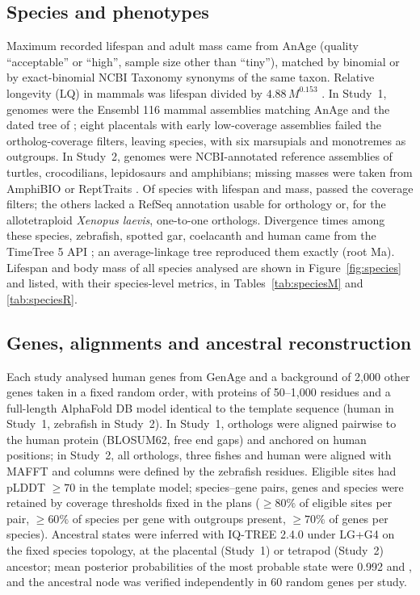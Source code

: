 \documentclass[11pt]{article}
\begin{document}
\subsection{Species and phenotypes}
Maximum recorded lifespan and adult mass came from AnAge \citep{deMagalhaes2024} (quality ``acceptable'' or ``high'', sample size other than ``tiny''), matched by binomial or by exact-binomial NCBI Taxonomy synonyms of the same taxon. Relative longevity (LQ) in mammals was lifespan divided by $4.88\,M^{0.153}$ \citep{deMagalhaes2007}. In Study~1, genomes were the Ensembl 116 mammal assemblies \citep{Dyer2025} matching AnAge and the dated tree of \citet{Upham2019}; eight placentals with early low-coverage assemblies failed the ortholog-coverage filters, leaving \MNSpecies{} species, with six marsupials and monotremes as outgroups. In Study~2, genomes were NCBI-annotated reference assemblies \citep{OLeary2024} of turtles, crocodilians, lepidosaurs and amphibians; missing masses were taken from AmphiBIO \citep{Oliveira2017} or ReptTraits \citep{Oskyrko2024}. Of \RNCandidates{} species with lifespan and mass, \RNSpecies{} passed the coverage filters; the others lacked a RefSeq annotation usable for orthology or, for the allotetraploid \emph{Xenopus laevis}, one-to-one orthologs. Divergence times among these species, zebrafish, spotted gar, coelacanth and human came from the TimeTree 5 API \citep{Kumar2022}; an average-linkage tree reproduced them exactly (root \RRootAge{} Ma). Lifespan and body mass of all species analysed are shown in Figure~\ref{fig:species} and listed, with their species-level metrics, in Tables~\ref{tab:speciesM} and \ref{tab:speciesR}.

\subsection{Genes, alignments and ancestral reconstruction}
Each study analysed human genes from GenAge \citep{deMagalhaes2024} and a background of 2,000 other genes taken in a fixed random order, with proteins of 50--1,000 residues and a full-length AlphaFold DB model \citep{Jumper2021,Varadi2024} identical to the template sequence (human in Study~1, zebrafish in Study~2). In Study~1, orthologs were aligned pairwise to the human protein (BLOSUM62, free end gaps) and anchored on human positions; in Study~2, all orthologs, three fishes and human were aligned with MAFFT \citep{Katoh2013} and columns were defined by the zebrafish residues. Eligible sites had pLDDT $\geq 70$ in the template model; species--gene pairs, genes and species were retained by coverage thresholds fixed in the plans ($\geq 80\%$ of eligible sites per pair, $\geq 60\%$ of species per gene with outgroups present, $\geq 70\%$ of genes per species). Ancestral states were inferred with IQ-TREE 2.4.0 \citep{Minh2020} under LG+G4 \citep{Le2008} on the fixed species topology, at the placental (Study~1) or tetrapod (Study~2) ancestor; mean posterior probabilities of the most probable state were 0.992 and \RAsrPost, and the ancestral node was verified independently in 60 random genes per study.
\end{document}
